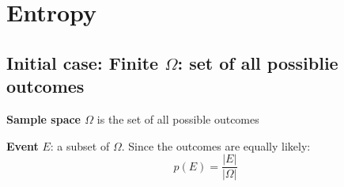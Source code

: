 \chapter{Entropy}

\section{Initial case: Finite $\Omega$: set of all possiblie outcomes}
\begin{definition}
\textbf{Sample space $\Omega$} is the set of all possible outcomes
\end{definition}
\begin{definition}
    \textbf{Event} $E$: a subset of $\Omega$. Since the outcomes are equally likely: 
    \[p(E) = \frac{|E|}{|\Omega|}\]
\end{definition}
